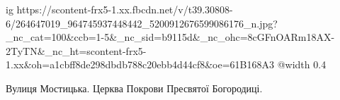  
 
 
 
 

\ifcmt
  ig https://scontent-frx5-1.xx.fbcdn.net/v/t39.30808-6/264647019_964745937448442_5200912676599086176_n.jpg?_nc_cat=100&ccb=1-5&_nc_sid=b9115d&_nc_ohc=8cGFnOARm18AX-2TyTN&_nc_ht=scontent-frx5-1.xx&oh=a1cbff8de298dbdb788c20ebb4d44cf8&oe=61B168A3
  @width 0.4
\fi

Вулиця Мостицька. Церква Покрови Пресвятої Богородиці.
